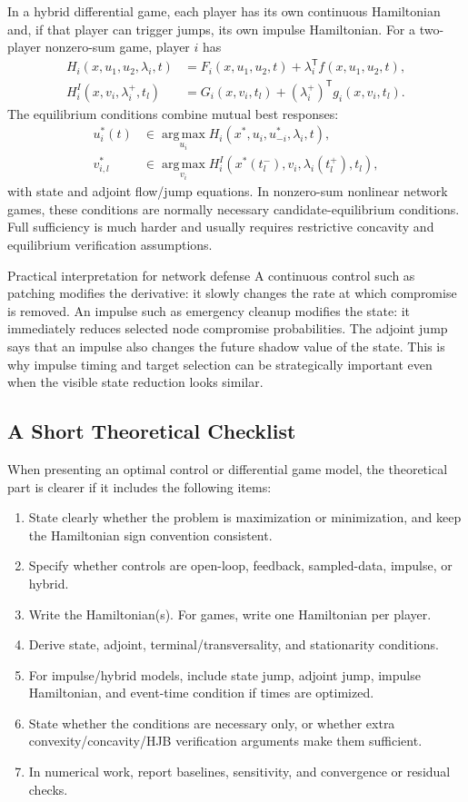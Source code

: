 \documentclass[11pt,a4paper]{article}
\newcommand{\argmax}{\operatorname*{arg\,max}}
\newcommand{\T}{\mathsf{T}}
\begin{document}
In a hybrid differential game, each player has its own continuous Hamiltonian and, if that player can trigger jumps, its own impulse Hamiltonian. For a two-player nonzero-sum game, player $i$ has
\begin{align}
  H_i(x,u_1,u_2,\lambda_i,t)&=F_i(x,u_1,u_2,t)+\lambda_i^{\T}f(x,u_1,u_2,t),\\
  H_i^I(x,v_i,\lambda_i^+,t_l)&=G_i(x,v_i,t_l)+(\lambda_i^+)^{\T}g_i(x,v_i,t_l).
\end{align}
The equilibrium conditions combine mutual best responses:
\begin{align}
  u_i^*(t)&\in\argmax_{u_i}H_i(x^*,u_i,u_{-i}^*,\lambda_i,t),\\
  v_{i,l}^*&\in\argmax_{v_i}H_i^I(x^*(t_l^-),v_i,\lambda_i(t_l^+),t_l),
\end{align}
with state and adjoint flow/jump equations. In nonzero-sum nonlinear network games, these conditions are normally necessary candidate-equilibrium conditions. Full sufficiency is much harder and usually requires restrictive concavity and equilibrium verification assumptions.

\begin{examplebox}{Practical interpretation for network defense}
A continuous control such as patching modifies the derivative: it slowly changes the rate at which compromise is removed. An impulse such as emergency cleanup modifies the state: it immediately reduces selected node compromise probabilities. The adjoint jump says that an impulse also changes the future shadow value of the state. This is why impulse timing and target selection can be strategically important even when the visible state reduction looks similar.
\end{examplebox}

\subsection{A Short Theoretical Checklist}

When presenting an optimal control or differential game model, the theoretical part is clearer if it includes the following items:
\begin{enumerate}
  \item State clearly whether the problem is maximization or minimization, and keep the Hamiltonian sign convention consistent.
  \item Specify whether controls are open-loop, feedback, sampled-data, impulse, or hybrid.
  \item Write the Hamiltonian(s). For games, write one Hamiltonian per player.
  \item Derive state, adjoint, terminal/transversality, and stationarity conditions.
  \item For impulse/hybrid models, include state jump, adjoint jump, impulse Hamiltonian, and event-time condition if times are optimized.
  \item State whether the conditions are necessary only, or whether extra convexity/concavity/HJB verification arguments make them sufficient.
  \item In numerical work, report baselines, sensitivity, and convergence or residual checks.
\end{enumerate}
\end{document}
